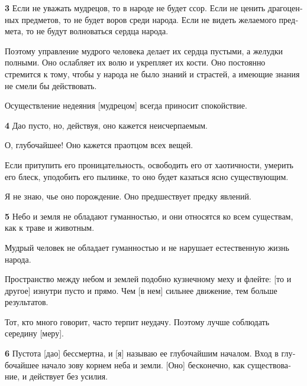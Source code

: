 \documentclass[a4paper]{article}
\begin{document}
{\ttfamily
\foreignlanguage{russian}{\textrm{\textbf{3}}}\foreignlanguage{russian}{\textrm{ Если не уважать мудрецов, то в народе
не будет ссор. Если не ценить драгоценных предметов, то не будет воров среди народа. Если не видеть желаемого предмета,
то не будут волноваться сердца народа.}}}

{
Поэтому управление мудрого человека делает их сердца пустыми, а желудки полными. Оно ослабляет их волю и укрепляет их
кости. Оно постоянно стремится к тому, чтобы у народа не было знаний и страстей, а имеющие знания не смели бы
действовать.}

{
Осуществление недеяния [мудрецом] всегда приносит спокойствие.}

{\ttfamily
\foreignlanguage{russian}{\textrm{\textbf{4}}}\foreignlanguage{russian}{\textrm{ Дао пусто, но, действуя, оно кажется
неисчерпаемым.}}}

{
О, глубочайшее! Оно кажется праотцом всех вещей.}

{
Если притупить его проницательность, освободить его от хаотичности, умерить его блеск, уподобить его пылинке, то оно
будет казаться ясно существующим.}

{
Я не знаю, чье оно порождение. Оно предшествует предку явлений.}

{\ttfamily
\foreignlanguage{russian}{\textrm{\textbf{5}}}\foreignlanguage{russian}{\textrm{ Небо и земля не обладают гуманностью, и
они относятся ко всем существам, как к траве и животным.}}}

{
Мудрый человек не обладает гуманностью и не нарушает естественную жизнь народа.}

{
Пространство между небом и землей подобно кузнечному меху и флейте: [то и другое] изнутри пусто и прямо. Чем [в нем]
сильнее движение, тем больше результатов.}

{
Тот, кто много говорит, часто терпит неудачу. Поэтому лучше соблюдать середину [меру].}

{\ttfamily
\foreignlanguage{russian}{\textrm{\textbf{6}}}\foreignlanguage{russian}{\textrm{ Пустота [дао] бессмертна, и [я] называю
ее глубочайшим началом. Вход в глубочайшее начало зову корнем неба и земли. [Оно] бесконечно, как существование, и
действует без усилия.}}}
\end{document}
